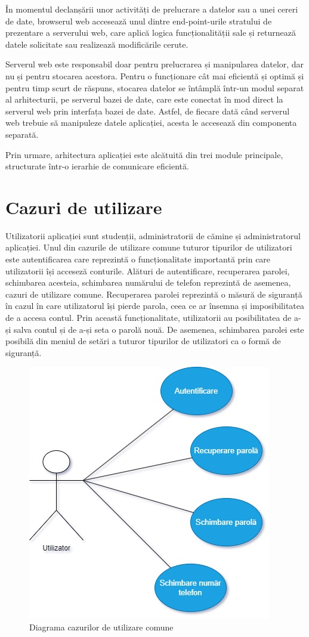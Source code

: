 \documentclass[12pt,a4paper]{report}
\theoremstyle{definition}
\theoremstyle{remark}
\begin{document}
\par În momentul declanșării unor activități de prelucrare a datelor sau a unei cereri de date, browserul web accesează unul dintre end-point-urile stratului de prezentare a serverului web, care aplică logica funcționalității sale și returnează datele solicitate sau realizează modificările cerute.

\par Serverul web este responsabil doar pentru prelucrarea și manipularea datelor, dar nu și pentru stocarea acestora. Pentru o funcționare cât mai eficientă și optimă și pentru timp scurt de răspuns, stocarea datelor se întâmplă într-un modul separat al arhitecturii, pe serverul bazei de date, care este conectat în mod direct la serverul web prin interfața bazei de date. Astfel, de fiecare dată când serverul web trebuie să manipuleze datele aplicației, acesta le accesează  din componenta separată.

\par Prin urmare, arhitectura aplicației este alcătuită din trei module principale, structurate într-o ierarhie de comunicare eficientă.

\section{Cazuri de utilizare} 
\par Utilizatorii aplicației sunt studenții, administratorii de cămine și administratorul aplicației. Unul din cazurile de utilizare comune tuturor tipurilor de utilizatori este autentificarea care reprezintă o funcționalitate importantă prin care utilizatorii își acceseză conturile. Alături de autentificare, recuperarea parolei, schimbarea acesteia,  schimbarea numărului de telefon reprezintă de asemenea, cazuri de utilizare comune. Recuperarea parolei reprezintă o măsură de siguranță în cazul în care utilizatorul își pierde parola, ceea ce ar însemna și imposibilitatea de a accesa contul. Prin această funcționalitate, utilizatorii au posibilitatea de a-și salva contul și de a-și seta o parolă nouă. De asemenea, schimbarea parolei este posibilă din meniul de setări a tuturor tipurilor de utilizatori ca o formă de siguranță.

\begin{figure}[H]
    \centering
    \includegraphics[width=0.5\linewidth, height=0.3\textheight]{resurse/diagrame/UVTDorms_UseCase_Student.jpg}
    \caption{Diagrama cazurilor de utilizare comune}
\end{figure}
\end{document}
